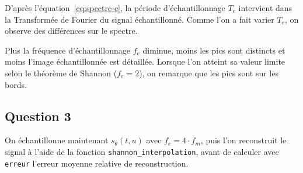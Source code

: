 \documentclass[a4paper]{article}
\renewcommand{\eqref}[1]{équation~\ref{#1}}
\begin{document}
D'après l'\eqref{eq:spectre-e}, la période d'échantillonnage $T_e$ intervient
dans la Transformée de Fourier du signal échantillonné. Comme l'on a fait varier
$T_e$, on observe des différences sur le spectre.

Plus la fréquence d'échantillonnage $f_e$ diminue, moins les pics sont distincts
et moins l'image échantillonnée est détaillée.
Lorsque l'on atteint sa valeur limite selon le théorème de Shannon ($f_e = 2$),
on remarque que les pics sont sur les bords. 

\subsection*{Question 3}

On échantillonne maintenant $s_{\theta}(t,u)$ avec $f_e = 4 \cdot f_m$, puis
l'on reconstruit le signal à l'aide de la fonction
\texttt{shannon\_interpolation}, avant de calculer avec \texttt{erreur} l'erreur
moyenne relative de reconstruction.
\end{document}
